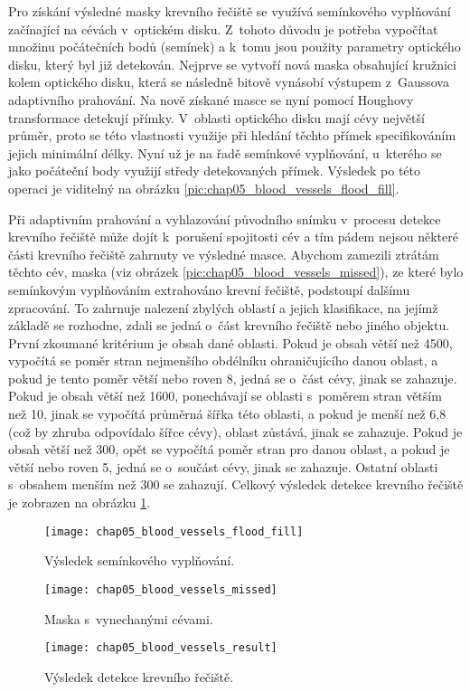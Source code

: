 Pro získání výsledné masky krevního řečiště se využívá semínkového vyplňování začínající na cévách v~optickém disku. Z~tohoto důvodu je potřeba vypočítat množinu počátečních bodů (semínek) a k~tomu jsou použity parametry optického disku, který byl již detekován. Nejprve se vytvoří nová maska obsahující kružnici kolem optického disku, která se následně bitově vynásobí výstupem z~Gaussova adaptivního prahování. Na nově získané masce se nyní pomocí Houghovy transformace detekují přímky. V~oblasti optického disku mají cévy největší průměr, proto se této vlastnosti využije při hledání těchto přímek specifikováním jejich minimální délky. Nyní už je na řadě semínkové vyplňování, u~kterého se jako počáteční body využijí středy detekovaných přímek. Výsledek po této operaci je viditelný na obrázku \ref{pic:chap05_blood_vessels_flood_fill}.

Při adaptivním prahování a vyhlazování původního snímku v~procesu detekce krevního řečiště může dojít k~porušení spojitosti cév a tím pádem nejsou některé části krevního řečiště zahrnuty ve výsledné masce. Abychom zamezili ztrátám těchto cév, maska (viz obrázek \ref{pic:chap05_blood_vessels_missed}), ze které bylo semínkovým vyplňováním extrahováno krevní řečiště, podstoupí dalšímu zpracování. To zahrnuje nalezení zbylých oblastí a jejich klasifikace, na jejímž základě se rozhodne, zdali se jedná o~část krevního řečiště nebo jiného objektu. První zkoumané kritérium je obsah dané oblasti. Pokud je obsah větší než 4500, vypočítá se poměr stran nejmenšího obdélníku ohraničujícího danou oblast, a pokud je tento poměr větší nebo roven 8, jedná se o~část cévy, jinak se zahazuje. Pokud je obsah větší než 1600, ponechávají se oblasti s~poměrem stran větším než 10, jinak se vypočítá průměrná šířka této oblasti, a pokud je menší než 6,8 (což by zhruba odpovídalo šířce cévy), oblast zůstává, jinak se zahazuje. Pokud je obsah větší než 300, opět se vypočítá poměr stran pro danou oblast, a pokud je větší nebo roven 5, jedná se o~součást cévy, jinak se zahazuje. Ostatní oblasti s~obsahem menším než 300 se zahazují. Celkový výsledek detekce krevního řečiště je zobrazen na obrázku \ref{pic:chap05_blood_vessels_result}.

\begin{figure}[h]
  \begin{minipage}[c]{0.315\textwidth}
    \texttt{[image: chap05\_blood\_vessels\_flood\_fill]}
    \caption{Výsledek semínkového vyplňování.}
    \label{pic:chap05_blood_vessels_flood_fill}
  \end{minipage}
  \hfill
    \begin{minipage}[c]{0.315\textwidth}
    \texttt{[image: chap05\_blood\_vessels\_missed]}
    \caption{Maska s~vynechanými cévami.}
    \label{pic:chap05_blood_vessels_missed}
  \end{minipage}
  \hfill
  \begin{minipage}[c]{0.315\textwidth}
    \texttt{[image: chap05\_blood\_vessels\_result]}
    \caption{Výsledek detekce krevního řečiště.}
    \label{pic:chap05_blood_vessels_result}
  \end{minipage}
\end{figure}


